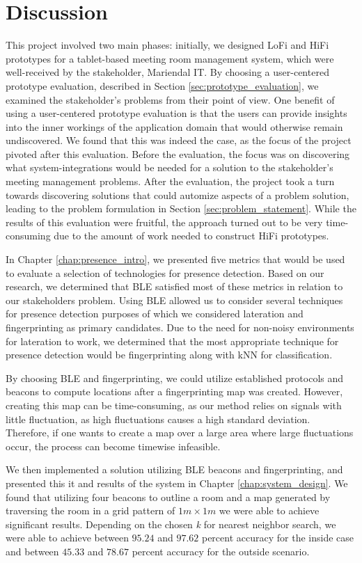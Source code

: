 \chapter{Discussion}\label{chap:discussion}
This project involved two main phases: initially, we designed LoFi and HiFi prototypes for a tablet-based meeting room management system, which were well-received by the stakeholder, Mariendal IT.
By choosing a user-centered prototype evaluation, described in Section \ref{sec:prototype_evaluation}, we examined the stakeholder's problems from their point of view.
One benefit of using a user-centered prototype evaluation is that the users can provide insights into the inner workings of the application domain that would otherwise remain undiscovered.
We found that this was indeed the case, as the focus of the project pivoted after this evaluation. 
Before the evaluation, the focus was on discovering what system-integrations would be needed for a solution to the stakeholder's meeting management problems.
After the evaluation, the project took a turn towards discovering solutions that could automize aspects of a problem solution, leading to the problem formulation in Section \ref{sec:problem_statement}.
While the results of this evaluation were fruitful, the approach turned out to be very time-consuming due to the amount of work needed to construct HiFi prototypes.

In Chapter \ref{chap:presence_intro}, we presented five metrics that would be used to evaluate a selection of technologies for presence detection.
Based on our research, we determined that BLE satisfied most of these metrics in relation to our stakeholders problem.
Using BLE allowed us to consider several techniques for presence detection purposes of which we considered lateration and fingerprinting as primary candidates.
Due to the need for non-noisy environments for lateration to work, we determined that the most appropriate technique for presence detection would be fingerprinting along with kNN for classification.

By choosing BLE and fingerprinting, we could utilize established protocols and beacons to compute locations after a fingerprinting map was created. 
However, creating this map can be time-consuming, as our method relies on signals with little fluctuation, as high fluctuations causes a high standard deviation. 
Therefore, if one wants to create a map over a large area where large fluctuations occur, the process can become timewise infeasible.

We then implemented a solution utilizing BLE beacons and fingerprinting, and presented this it and results of the system in Chapter \ref{chap:system_design}.
We found that utilizing four beacons to outline a room and a map generated by traversing the room in a grid pattern of $1m \times 1m$ we were able to achieve significant results.
Depending on the chosen \textit{k} for nearest neighbor search, we were able to achieve between $95.24$ and $97.62$ percent accuracy for the inside case and between $45.33$ and $78.67$ percent accuracy for the outside scenario. 

